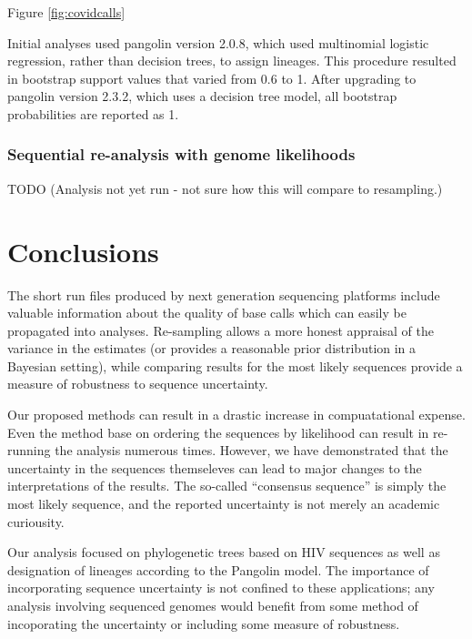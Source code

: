 \documentclass[
]{article}
\begin{document}
Figure \ref{fig:covidcalls}

Initial analyses used pangolin version 2.0.8, which used multinomial
logistic regression, rather than decision trees, to assign lineages.
This procedure resulted in bootstrap support values that varied from 0.6
to 1. After upgrading to pangolin version 2.3.2, which uses a decision
tree model, all bootstrap probabilities are reported as 1.

\hypertarget{sequential-re-analysis-with-genome-likelihoods}{%
\subsubsection{Sequential re-analysis with genome
likelihoods}\label{sequential-re-analysis-with-genome-likelihoods}}

TODO (Analysis not yet run - not sure how this will compare to
resampling.)

\hypertarget{conclusions}{%
\section{Conclusions}\label{conclusions}}

The short run files produced by next generation sequencing platforms
include valuable information about the quality of base calls which can
easily be propagated into analyses. Re-sampling allows a more honest
appraisal of the variance in the estimates (or provides a reasonable
prior distribution in a Bayesian setting), while comparing results for
the most likely sequences provide a measure of robustness to sequence
uncertainty.

Our proposed methods can result in a drastic increase in compuatational
expense. Even the method base on ordering the sequences by likelihood
can result in re-running the analysis numerous times. However, we have
demonstrated that the uncertainty in the sequences themseleves can lead
to major changes to the interpretations of the results. The so-called
``consensus sequence'' is simply the most likely sequence, and the
reported uncertainty is not merely an academic curiousity.

Our analysis focused on phylogenetic trees based on HIV sequences as
well as designation of lineages according to the Pangolin model. The
importance of incorporating sequence uncertainty is not confined to
these applications; any analysis involving sequenced genomes would
benefit from some method of incoporating the uncertainty or including
some measure of robustness.
\end{document}
